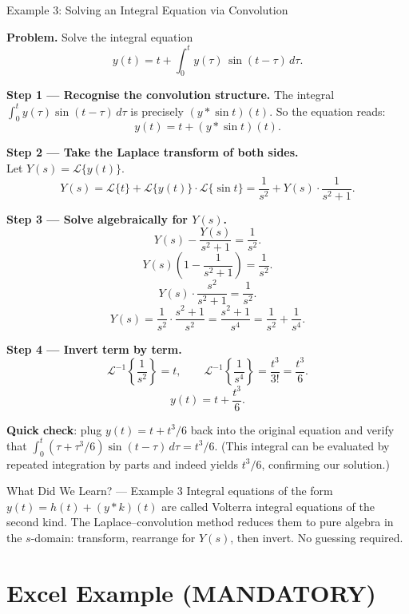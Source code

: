 \documentclass[12pt,a4paper]{article}
\begin{document}
\begin{infobox}{Example 3: Solving an Integral Equation via Convolution}

\textbf{Problem.} Solve the integral equation
\[
  y(t) = t + \int_0^t y(\tau)\,\sin(t-\tau)\,d\tau.
\]

\textbf{Step 1 --- Recognise the convolution structure.}
The integral $\displaystyle\int_0^t y(\tau)\sin(t-\tau)\,d\tau$ is precisely $(y{*}\sin t)(t)$.
So the equation reads:
\[
  y(t) = t + (y * \sin t)(t).
\]

\textbf{Step 2 --- Take the Laplace transform of both sides.}\\
Let $Y(s) = \mathcal{L}\{y(t)\}$.
\[
  Y(s) = \mathcal{L}\{t\} + \mathcal{L}\{y(t)\}\cdot\mathcal{L}\{\sin t\}
       = \frac{1}{s^2} + Y(s)\cdot\frac{1}{s^2+1}.
\]

\textbf{Step 3 --- Solve algebraically for $Y(s)$.}
\[
  Y(s) - \frac{Y(s)}{s^2+1} = \frac{1}{s^2}.
\]
\[
  Y(s)\!\left(1 - \frac{1}{s^2+1}\right) = \frac{1}{s^2}.
\]
\[
  Y(s)\cdot\frac{s^2}{s^2+1} = \frac{1}{s^2}.
\]
\[
  Y(s) = \frac{1}{s^2}\cdot\frac{s^2+1}{s^2} = \frac{s^2+1}{s^4} = \frac{1}{s^2} + \frac{1}{s^4}.
\]

\textbf{Step 4 --- Invert term by term.}
\[
  \mathcal{L}^{-1}\!\left\{\frac{1}{s^2}\right\} = t, \qquad
  \mathcal{L}^{-1}\!\left\{\frac{1}{s^4}\right\} = \frac{t^3}{3!} = \frac{t^3}{6}.
\]
\[
  \boxed{y(t) = t + \frac{t^3}{6}.}
\]

\textbf{Quick check}: plug $y(t)=t+t^3/6$ back into the original equation and verify that
$\int_0^t (τ+\tau^3/6)\sin(t-\tau)\,d\tau = t^3/6$. (This integral can be evaluated by
repeated integration by parts and indeed yields $t^3/6$, confirming our solution.)
\end{infobox}

\begin{learnbox}{What Did We Learn? --- Example 3}
Integral equations of the form $y(t) = h(t) + (y{*}k)(t)$ are called Volterra integral
equations of the second kind. The Laplace--convolution method reduces them to pure algebra
in the $s$-domain: transform, rearrange for $Y(s)$, then invert. No guessing required.
\end{learnbox}

\section{Excel Example (MANDATORY)}
\end{document}
